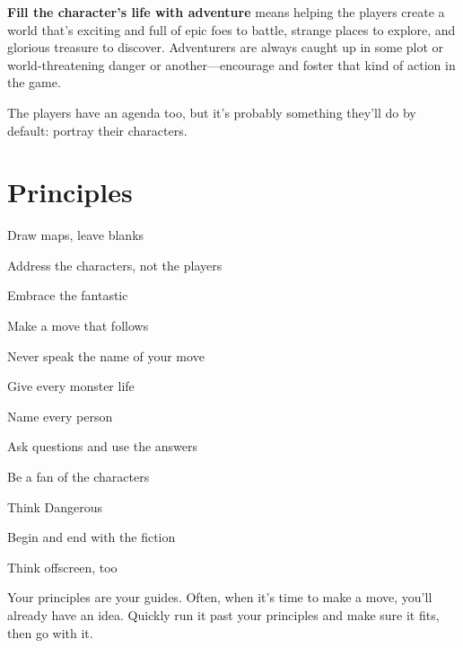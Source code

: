        

         {\bf Fill the character's life with adventure}  means helping the players create a world that's exciting and full of epic foes to battle, strange places to explore, and glorious treasure to discover. Adventurers are always caught up in some plot or world-threatening danger or another—encourage and foster that kind of action in the game.

       

The players have an agenda too, but it's probably something they'll do by default: portray their characters.

       
\section{Principles}   
       
\startitemize[1,packed]
         
\item Draw maps, leave blanks

         
\item Address the characters, not the players

         
\item Embrace the fantastic

         
\item Make a move that follows

         
\item Never speak the name of your move

         
\item Give every monster life

         
\item Name every person

         
\item Ask questions and use the answers

         
\item Be a fan of the characters

         
\item Think Dangerous

         
\item Begin and end with the fiction

         
\item Think offscreen, too

       
\stopitemize
       

Your principles are your guides. Often, when it's time to make a move, you'll already have an idea. Quickly run it past your principles and make sure it fits, then go with it.

